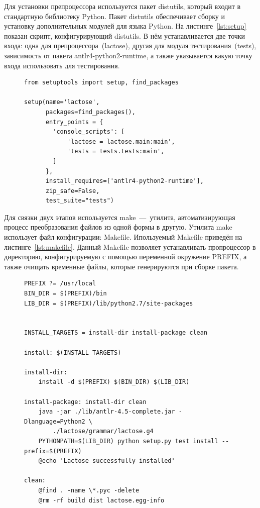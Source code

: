 \documentclass[12pt,a4paper,oneside]{extarticle}
\begin{document}
        Для установки препроцессора используется пакет distutils, который входит в стандартную библиотеку Python.
        Пакет distutils обеспечивает сборку и установку дополнительных модулей для языка Python.
        На листинге~\ref{lst:setup} показан скрипт, конфигурирующий distutils.
        В нём устанавливается две точки входа: одна для препроцессора~(lactose), другая для модуля тестирования~(tests), зависимость от пакета antlr4-python2-runtime, а также указывается какую точку входа использовать для тестирования.

        \begin{figure}[h!]  
            \begin{lstlisting}[label={lst:setup},caption={Cкрипт конфигурации для утилиты distutils},captionpos=b]
from setuptools import setup, find_packages

setup(name='lactose',
      packages=find_packages(),
      entry_points = {
        'console_scripts': [
            'lactose = lactose.main:main',
            'tests = tests.tests:main',
        ]
      },
      install_requires=['antlr4-python2-runtime'],
      zip_safe=False,
      test_suite="tests")

            \end{lstlisting}
        \end{figure}

        Для связки двух этапов используется make~---~утилита, автоматизирующая процесс преобразования файлов из одной формы в другую.
        Утилита make использует файл конфигурации: Makefile.
        Ипользуемый Makefile приведён на листинге~\ref{lst:makefile}.
        Данный Makefile позволяет устанавливать пропроцессор в директорию, конфигурируемую с помощью переменной окружение PREFIX, а также очищать временные файлы, которые генерируются при сборке пакета.

        \begin{figure}[h!]  
            \begin{lstlisting}[label={lst:makefile},caption={Cкрипт конфигурации для утилиты make},captionpos=b]
PREFIX ?= /usr/local
BIN_DIR = $(PREFIX)/bin
LIB_DIR = $(PREFIX)/lib/python2.7/site-packages


INSTALL_TARGETS = install-dir install-package clean

install: $(INSTALL_TARGETS)

install-dir:
    install -d $(PREFIX) $(BIN_DIR) $(LIB_DIR)

install-package: install-dir clean
    java -jar ./lib/antlr-4.5-complete.jar -Dlanguage=Python2 \
        ./lactose/grammar/lactose.g4
    PYTHONPATH=$(LIB_DIR) python setup.py test install --prefix=$(PREFIX)
    @echo 'Lactose successfully installed'

clean:
    @find . -name \*.pyc -delete
    @rm -rf build dist lactose.egg-info

            \end{lstlisting}
        \end{figure}
\end{document}
